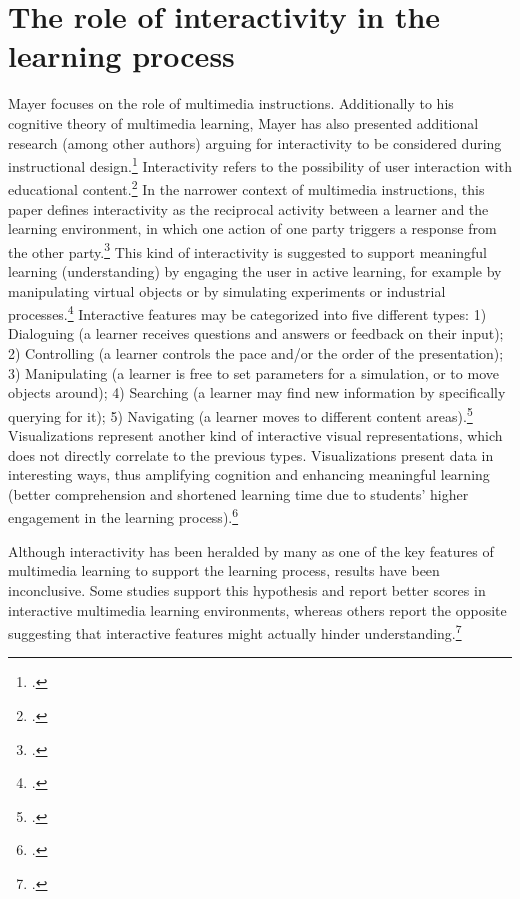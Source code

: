 \section{The role of interactivity in the learning process} \label{sec:Interactivity}
Mayer focuses on the role of multimedia instructions. Additionally to his cognitive theory of multimedia learning, Mayer has also presented additional research (among other authors) arguing for interactivity to be considered during instructional design.\footcites[Cf.][chapter 2, paragraph 12]{ClarkElearningscienceinstruction2016} Interactivity refers to the possibility of user interaction with educational content.\footcites[Cf.][p.292]{PatwardhanWhendoeshigher2015} In the narrower context of multimedia instructions, this paper defines interactivity as the reciprocal activity between a learner and the learning environment, in which one action of one party triggers a response from the other party.\footcites[Cf.][p.1025]{DomagkInteractivitymultimedialearning2010} This kind of interactivity is suggested to support meaningful learning (understanding) by engaging the user in active learning, for example by manipulating virtual objects or by simulating experiments or industrial processes.\footcites[Cf.][p.161]{CairncrossInteractiveMultimediaLearning2001}[cf.][p.1159]{Evansinteractivityeffectmultimedia2007} Interactive features may be categorized into five different types: 1) Dialoguing (a learner receives questions and answers or feedback on their input); 2) Controlling (a learner controls the pace and/or the order of the presentation); 3) Manipulating (a learner is free to set parameters for a simulation, or to move objects around); 4) Searching (a learner may find new information by specifically querying for it); 5) Navigating (a learner moves to different content areas).\footcites[Cf.][p.311]{MorenoInteractiveMultimodalLearning2007} Visualizations represent another kind of interactive visual representations, which does not directly correlate to the previous types. Visualizations present data in interesting ways, thus amplifying cognition and enhancing meaningful learning (better comprehension and shortened learning time due to students' higher engagement in the learning process).\footcites[Cf.][p.294]{PatwardhanWhendoeshigher2015} 

Although interactivity has been heralded by many as one of the key features of multimedia learning to support the learning process, results have been inconclusive. Some studies support this hypothesis and report better scores in interactive multimedia learning environments, whereas others report the opposite suggesting that interactive features might actually hinder understanding.\footcites[Cf.][p.1024]{DomagkInteractivitymultimedialearning2010}[cf.][]{MayerWhenLearningJust2001}[cf.][p.156]{CairncrossInteractiveMultimediaLearning2001}[cf.][p. 1148 et seqq]{Evansinteractivityeffectmultimedia2007}[cf.][p.48]{SordenCognitiveTheoryMultimedia2012}

